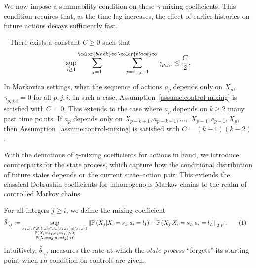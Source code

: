 \documentclass[twoside,11pt]{article}
\numberwithin{equation}{section}
\newcommand{\lp}{\left(}
\newcommand{\rp}{\right)}
\newcommand{\Pbb}{\mathbb{P}}
\newcommand{\indexeddata}{\left\{(X_0,a_0),\dots,(X_n,a_n)\right\}}
\newcommand\numberthis{\addtocounter{equation}{1}\tag{\theequation}}
\newcommand{\prob}{\Pbb}
\newcommand{\probl}{\prob}
\begin{document}
We now impose a summability condition on these $\gamma$-mixing coefficients.
This condition requires that, as the time lag increases, the effect of earlier histories on future actions decays sufficiently fast.
\begin{assumption}~\label{assume:control-mixing} There exists a constant $C\geq 0$ such that
\begin{align*}
    \sup_{i \geq 1}\sum_{j=1}^{{\color{black} \infty}} \sum_{p=i+j+1}^{{\color{black} \infty}} \gamma_{p,j,i}\leq \frac{C}{2}.
\end{align*}

\end{assumption}
In Markovian settings, when the sequence of actions $a_p$ depends only on $X_p$,
$
 \gamma_{p,j,i}=0
$
for all $p,j,i$. 
In such a case, Assumption~\ref{assume:control-mixing} is satisfied with $C=0$. 
This extends to the case where $a_p$ depends on $k \geq 2$ many past time points. 
If $a_p$ depends only on $X_{p-k+1}, a_{p-k+1}, \dots,$ $X_{p-1}, a_{p-1}, X_p$, then Assumption~\ref{assume:control-mixing} is satisfied with $C=(k-1)(k-2)$. 

With the definitions of $\gamma$-mixing coefficients for actions in hand, we introduce counterparts for the state process, which capture how the conditional distribution of future states depends on the current state–action pair.
This extends the classical Dobrushin coefficients \citep{dobrushin1956central,dobrushin1956centralII,mukhamedov2013dobrushin} for inhomogenous Markov chains to the realm of controlled Markov chains. 

For all integers $j\geq i$, we define the mixing coefficient 
\begin{align*}
& \bar \theta_{i,j}:= \underset{\substack{s_1,s_2\in\mathcal S,l_1,l_2\in \mathcal A, (s_1,l_1)\neq(s_2,l_2)\\ \prob(X_i=s_1,a_i=l_1)>0,\\ \prob(X_i=s_2,a_i=l_2)>0  }}{\sup}  \left\| \probl\lp X_j|X_i=s_1,a_i=l_1\rp-\probl\lp X_j|X_i=s_2,a_i=l_2\rp \right\|_{TV}.\numberthis\label{eq:def-theta}
\end{align*}
Intuitively, $\bar \theta_{i,j}$ measures the rate at which the \emph{state process} ``forgets'' its starting point when no condition on controls are given.
\end{document}
